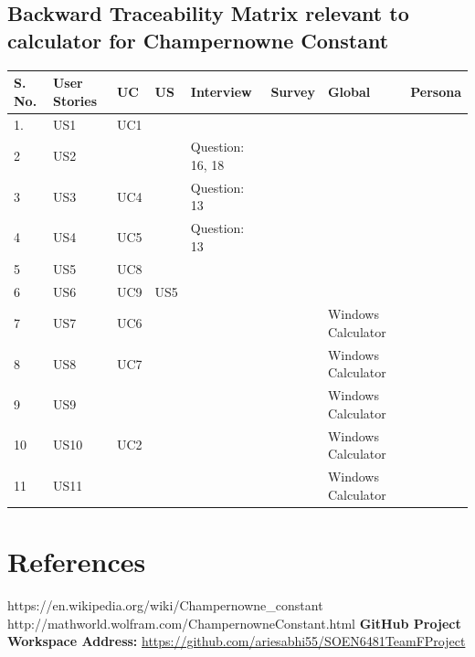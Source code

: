 \documentclass[paper=a4, fontsize=11pt]{report}
\numberwithin{equation}{section}		%
\numberwithin{figure}{section}			%
\numberwithin{table}{section}				%
\begin{document}
  
\section{Backward Traceability Matrix relevant to calculator for Champernowne Constant }

\begin{center}
\begin{tabular}{| m{.8cm} | m{1.8cm} | m{.8cm} | m{.8cm}| m{3cm} | m{1cm} | m{3cm} | m{1.5cm} |} 
\hline
S. No. & User Stories & UC & US & Interview & Survey & Global & Persona \\ [0.7ex]
\hline\hline
1. & US1 & UC1 &  &  &  &  & \\ 
\hline
2 & US2 &  &  & Question: 16, 18 &  &  &   \\ 
\hline
3 & US3 & UC4 &  & Question: 13 &  &  &  \\ 
\hline
4 & US4 & UC5 &  & Question: 13 &  &  &  \\ 
\hline
5 & US5 & UC8 &  &  &  &  &  \\ 
\hline
6 & US6 & UC9 & US5 &  &  &  &  \\ 
\hline
7 & US7 & UC6 &  &  &  & Windows Calculator &  \\ 
\hline
8 & US8 & UC7 &  &  &  & Windows Calculator & \\ 
\hline
9 & US9 &  &  &  &  & Windows Calculator &  \\ 
\hline
10 & US10 & UC2 &  &  &  & Windows Calculator &  \\ 
\hline
11 & US11 &  &  &  &  & Windows Calculator &  \\ 
\hline
\end{tabular}
\end{center}



\printglossary

\chapter{References}

https://en.wikipedia.org/wiki/Champernowne\_constant
\vskip1mm
http://mathworld.wolfram.com/ChampernowneConstant.html
\vskip1mm
\textbf{GitHub Project Workspace Address:} \url{https://github.com/ariesabhi55/SOEN6481TeamFProject} 
\end{document}
